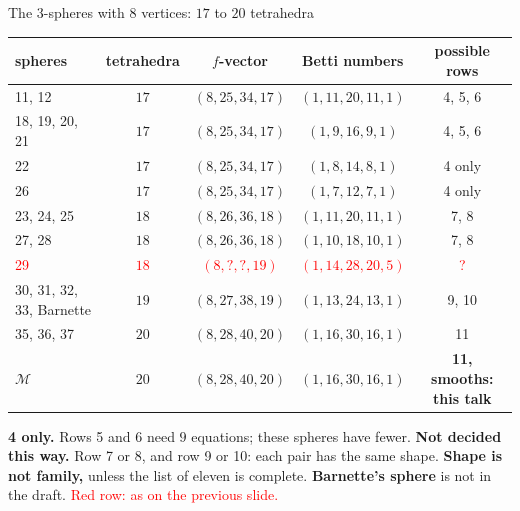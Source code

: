 \begin{frame}{The \(3\)-spheres with \(8\) vertices: \(17\) to \(20\) tetrahedra}
{\centering\small
\renewcommand{\arraystretch}{1.0}\setlength{\tabcolsep}{5pt}
\begin{tabular}{lcccc}
spheres & tetrahedra & \(f\)-vector & Betti numbers & possible rows\\ \hline
11, 12 & \(17\) & \((8,25,34,17)\) & \((1,11,20,11,1)\) & 4, 5, 6\\
18, 19, 20, 21 & \(17\) & \((8,25,34,17)\) & \((1,9,16,9,1)\) & 4, 5, 6\\
22 & \(17\) & \((8,25,34,17)\) & \((1,8,14,8,1)\) & 4 only\\
26 & \(17\) & \((8,25,34,17)\) & \((1,7,12,7,1)\) & 4 only\\
23, 24, 25 & \(18\) & \((8,26,36,18)\) & \((1,11,20,11,1)\) & 7, 8\\
27, 28 & \(18\) & \((8,26,36,18)\) & \((1,10,18,10,1)\) & 7, 8\\
\textcolor{red}{29} & \textcolor{red}{\(18\)} & \textcolor{red}{\((8,?,?,19)\)} & \textcolor{red}{\((1,14,28,20,5)\)} & \textcolor{red}{?}\\
30, 31, 32, 33, Barnette & \(19\) & \((8,27,38,19)\) & \((1,13,24,13,1)\) & 9, 10\\
35, 36, 37 & \(20\) & \((8,28,40,20)\) & \((1,16,30,16,1)\) & 11\\
\(\mathcal M\) & \(20\) & \((8,28,40,20)\) & \((1,16,30,16,1)\) & \textbf{11, smooths: this talk}\\
\end{tabular}\par}\smallskip
{\footnotesize \textbf{4 only.} Rows 5 and 6 need \(9\) equations; these spheres have fewer. \textbf{Not decided this way.} Row 7 or 8, and row 9 or 10: each pair has the same shape. \textbf{Shape is not family,} unless the list of eleven is complete. \textbf{Barnette's sphere} is not in the draft. \textcolor{red}{Red row: as on the previous slide.}\par}
\end{frame}

